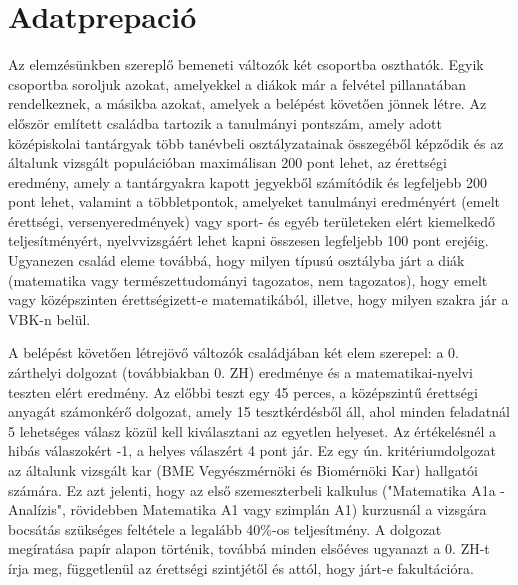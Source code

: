 \documentclass[12pt]{article}
\begin{document}

\newpage

\section{Adatprepació}

Az elemzésünkben szereplő bemeneti változók két csoportba oszthatók. Egyik csoportba soroljuk azokat, amelyekkel a diákok már a felvétel pillanatában rendelkeznek, a másikba azokat, amelyek a belépést követően jönnek létre. Az először említett családba tartozik a tanulmányi pontszám, amely adott középiskolai tantárgyak több tanévbeli osztályzatainak összegéből képződik és az általunk vizsgált populációban maximálisan 200 pont lehet, az érettségi eredmény, amely a tantárgyakra kapott jegyekből számítódik és legfeljebb 200 pont lehet, valamint a többletpontok, amelyeket tanulmányi eredményért (emelt érettségi, versenyeredmények) vagy sport- és egyéb területeken elért kiemelkedő teljesítményért, nyelvvizsgáért lehet kapni összesen legfeljebb 100 pont erejéig. Ugyanezen család eleme továbbá, hogy milyen típusú osztályba járt a diák (matematika vagy természettudományi tagozatos, nem tagozatos), hogy emelt vagy középszinten érettségizett-e matematikából, illetve, hogy milyen szakra jár a VBK-n belül.

A belépést követően létrejövő változók családjában két elem szerepel: a 0. zárthelyi dolgozat (továbbiakban 0. ZH) eredménye és a matematikai-nyelvi teszten elért eredmény. Az előbbi teszt egy 45 perces, a középszintű érettségi anyagát számonkérő dolgozat, amely 15 tesztkérdésből áll, ahol minden feladatnál 5 lehetséges válasz közül kell kiválasztani az egyetlen helyeset. Az értékelésnél a hibás válaszokért -1, a helyes válaszért 4 pont jár. Ez egy ún. kritériumdolgozat az általunk vizsgált kar (BME Vegyészmérnöki és Biomérnöki Kar) hallgatói számára. Ez azt jelenti, hogy az első szemeszterbeli kalkulus ("Matematika A1a - Analízis", rövidebben Matematika A1 vagy szimplán A1) kurzusnál a vizsgára bocsátás szükséges feltétele a legalább 40\%-os teljesítmény. A dolgozat megíratása papír alapon történik, továbbá minden elsőéves ugyanazt a 0. ZH-t írja meg, függetlenül az érettségi szintjétől és attól, hogy járt-e fakultációra.
\end{document}
